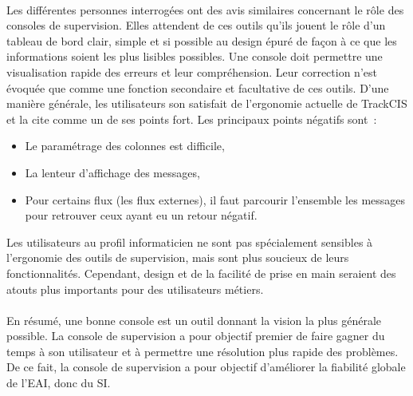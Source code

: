 			\paragraph{}%
			Les différentes personnes interrogées ont des avis similaires concernant le
			rôle des consoles de supervision. Elles attendent
			de ces outils qu’ils jouent le rôle d'un tableau de bord clair, simple et si
			possible au design épuré de façon à ce que les informations soient les plus
			lisibles possibles. Une console doit permettre une visualisation rapide des
			erreurs et leur compréhension. Leur correction n’est évoquée que comme une
			fonction secondaire et facultative de ces outils.\newline
			D’une manière générale, les utilisateurs son satisfait de l’ergonomie
			actuelle de TrackCIS et la cite comme un de ses points fort.
			Les principaux points négatifs sont~:
			\begin{itemize}
			  \item Le paramétrage des colonnes est difficile,
			  \item La lenteur d’affichage des messages,
			  \item Pour certains flux  (les flux externes), il faut parcourir l'ensemble
			  les messages pour retrouver ceux ayant eu un retour négatif.
			\end{itemize}
			Les utilisateurs au profil informaticien ne sont pas spécialement sensibles
			à l’ergonomie des outils de supervision, mais sont plus soucieux de leurs
			fonctionnalités. Cependant, design et de la facilité de prise en main
			seraient des atouts plus importants pour des utilisateurs métiers.
			
			\paragraph{}%
			En résumé, une bonne console est un outil donnant la vision la plus générale
			possible. La console de supervision a pour objectif premier de faire gagner
			du temps à son utilisateur et à permettre une résolution plus rapide des
			problèmes. De ce fait, la console de supervision a pour objectif d’améliorer
			la fiabilité globale de l’EAI, donc du SI.
			
